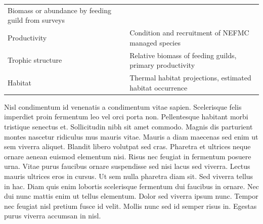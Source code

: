 \documentclass[11pt,]{article}
\begin{document}
\begin{longtable}[]{@{}ll@{}}
\begin{minipage}[t]{0.65\columnwidth}
Biomass or abundance by feeding guild from surveys\strut
\end{minipage}\tabularnewline
\begin{minipage}[t]{0.29\columnwidth}\raggedright
Productivity\strut
\end{minipage} & \begin{minipage}[t]{0.65\columnwidth}\raggedright
Condition and recruitment of NEFMC managed species\strut
\end{minipage}\tabularnewline
\begin{minipage}[t]{0.29\columnwidth}\raggedright
Trophic structure\strut
\end{minipage} & \begin{minipage}[t]{0.65\columnwidth}\raggedright
Relative biomass of feeding guilds, primary productivity\strut
\end{minipage}\tabularnewline
\begin{minipage}[t]{0.29\columnwidth}\raggedright
Habitat\strut
\end{minipage} & \begin{minipage}[t]{0.65\columnwidth}\raggedright
Thermal habitat projections, estimated habitat occurrence\strut
\end{minipage}\tabularnewline
\bottomrule
\end{longtable}

Nisl condimentum id venenatis a condimentum vitae sapien. Scelerisque
felis imperdiet proin fermentum leo vel orci porta non. Pellentesque
habitant morbi tristique senectus et. Sollicitudin nibh sit amet
commodo. Magnis dis parturient montes nascetur ridiculus mus mauris
vitae. Mauris a diam maecenas sed enim ut sem viverra aliquet. Blandit
libero volutpat sed cras. Pharetra et ultrices neque ornare aenean
euismod elementum nisi. Risus nec feugiat in fermentum posuere urna.
Vitae purus faucibus ornare suspendisse sed nisi lacus sed viverra.
Lectus mauris ultrices eros in cursus. Ut sem nulla pharetra diam sit.
Sed viverra tellus in hac. Diam quis enim lobortis scelerisque fermentum
dui faucibus in ornare. Nec dui nunc mattis enim ut tellus elementum.
Dolor sed viverra ipsum nunc. Tempor nec feugiat nisl pretium fusce id
velit. Mollis nunc sed id semper risus in. Egestas purus viverra
accumsan in nisl.
\end{document}
